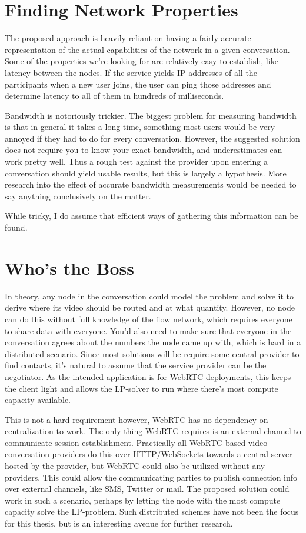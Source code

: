 \section{Finding Network Properties}

The proposed approach is heavily reliant on having a fairly accurate representation of the actual capabilities of the network in a given conversation. Some of the properties we're looking for are relatively easy to establish, like latency between the nodes. If the service yields IP-addresses of all the participants when a new user joins, the user can ping those addresses and determine latency to all of them in hundreds of milliseconds.

Bandwidth is notoriously trickier. The biggest problem for measuring bandwidth is that in general it takes a long time, something most users would be very annoyed if they had to do for every conversation. However, the suggested solution does not require you to know your exact bandwidth, and underestimates can work pretty well. Thus a rough test against the provider upon entering a conversation should yield usable results, but this is largely a hypothesis. More research into the effect of accurate bandwidth measurements would be needed to say anything conclusively on the matter.

While tricky, I do assume that efficient ways of gathering this information can be found.


\section{Who's the Boss}

In theory, any node in the conversation could model the problem and solve it to derive where its video should be routed and at what quantity. However, no node can do this without full knowledge of the flow network, which requires everyone to share data with everyone. You'd also need to make sure that everyone in the conversation agrees about the numbers the node came up with, which is hard in a distributed scenario. Since most solutions will be require some central provider to find contacts, it's natural to assume that the service provider can be the negotiator. As the intended application is for WebRTC deployments, this keeps the client light and allows the LP-solver to run where there's most compute capacity available.

This is not a hard requirement however, WebRTC has no dependency on centralization to work. The only thing WebRTC requires is an external channel to communicate session establishment. Practically all WebRTC-based video conversation providers do this over HTTP/WebSockets towards a central server hosted by the provider, but WebRTC could also be utilized without any providers. This could allow the communicating parties to publish connection info over external channels, like SMS, Twitter or mail. The proposed solution could work in such a scenario, perhaps by letting the node with the most compute capacity solve the LP-problem. Such distributed schemes have not been the focus for this thesis, but is an interesting avenue for further research.


